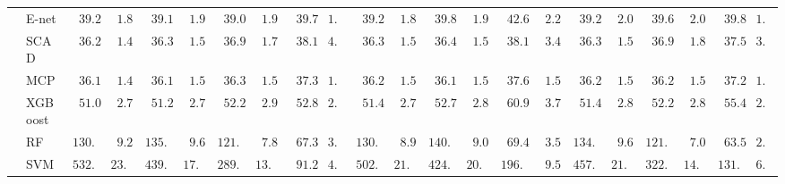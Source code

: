 \begin{tabular}{ll|ll|llllll|llllll|llllll}
 & E-net  & $\phantom{0}39.24$ & $\phantom{0}1.84$ & $\phantom{0}39.13$ & $\phantom{0}1.90$ & $\phantom{0}39.09$ & $\phantom{0}1.94$ & $\phantom{0}39.74$ & $1.90$ & $\phantom{0}39.26$ & $\phantom{0}1.83$ & $\phantom{0}39.81$ & $\phantom{0}1.98$ & $\phantom{0}42.60$ & $\phantom{0}2.24$ & $\phantom{0}39.29$ & $\phantom{0}2.00$ & $\phantom{0}39.63$ & $\phantom{0}2.04$ & $\phantom{0}39.80$ & $1.95$ \\
 & SCAD  & $\phantom{0}36.27$ & $\phantom{0}1.49$ & $\phantom{0}36.32$ & $\phantom{0}1.58$ & $\phantom{0}36.95$ & $\phantom{0}1.76$ & $\phantom{0}38.16$ & $4.69$ & $\phantom{0}36.31$ & $\phantom{0}1.58$ & $\phantom{0}36.45$ & $\phantom{0}1.53$ & $\phantom{0}38.16$ & $\phantom{0}3.44$ & $\phantom{0}36.35$ & $\phantom{0}1.54$ & $\phantom{0}36.96$ & $\phantom{0}1.82$ & $\phantom{0}37.55$ & $3.27$ \\
 & MCP  & $\phantom{0}36.19$ & $\phantom{0}1.49$ & $\phantom{0}36.19$ & $\phantom{0}1.55$ & $\phantom{0}36.30$ & $\phantom{0}1.56$ & $\phantom{0}37.39$ & $1.62$ & $\phantom{0}36.21$ & $\phantom{0}1.55$ & $\phantom{0}36.19$ & $\phantom{0}1.51$ & $\phantom{0}37.69$ & $\phantom{0}1.53$ & $\phantom{0}36.23$ & $\phantom{0}1.51$ & $\phantom{0}36.26$ & $\phantom{0}1.55$ & $\phantom{0}37.29$ & $1.57$ \\
 & XGBoost  & $\phantom{0}51.08$ & $\phantom{0}2.73$ & $\phantom{0}51.24$ & $\phantom{0}2.72$ & $\phantom{0}52.21$ & $\phantom{0}2.96$ & $\phantom{0}52.85$ & $2.67$ & $\phantom{0}51.44$ & $\phantom{0}2.71$ & $\phantom{0}52.78$ & $\phantom{0}2.88$ & $\phantom{0}60.95$ & $\phantom{0}3.75$ & $\phantom{0}51.48$ & $\phantom{0}2.83$ & $\phantom{0}52.20$ & $\phantom{0}2.85$ & $\phantom{0}55.40$ & $2.96$ \\
 & RF  & $130.46$ & $\phantom{0}9.29$ & $135.14$ & $\phantom{0}9.66$ & $121.75$ & $\phantom{0}7.87$ & $\phantom{0}67.30$ & $3.26$ & $130.90$ & $\phantom{0}8.92$ & $140.14$ & $\phantom{0}9.02$ & $\phantom{0}69.44$ & $\phantom{0}3.53$ & $134.46$ & $\phantom{0}9.61$ & $121.42$ & $\phantom{0}7.05$ & $\phantom{0}63.58$ & $2.97$ \\
 & SVM  & $532.95$ & $23.61$ & $439.60$ & $17.79$ & $289.85$ & $13.10$ & $\phantom{0}91.22$ & $4.25$ & $502.81$ & $21.47$ & $424.26$ & $20.66$ & $196.59$ & $\phantom{0}9.51$ & $457.51$ & $21.50$ & $322.04$ & $14.34$ & $131.03$ & $6.13$ \\
\hline 
\end{tabular}

